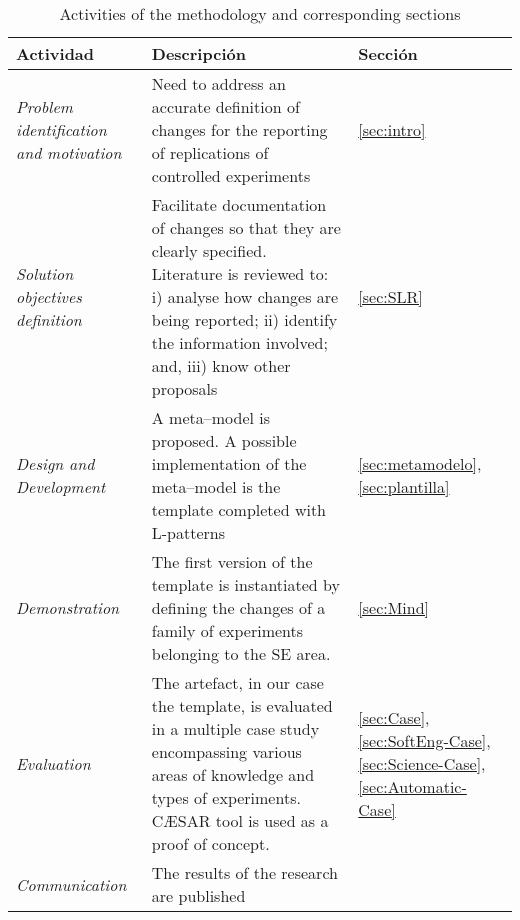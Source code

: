 \begin{table*}
  \caption{Activities of the \DSR methodology and corresponding sections}
  \label{tab:fases-DSR}
  \centering
  \scriptsize
  \begin{tabularx}{0.98\textwidth}{
    >{\hsize=0.4\hsize}X
    >{\hsize=0.9\hsize}X
    >{\hsize=0.23\hsize}X}
 
    \toprule
    Actividad  &
    Descripción   &
    Sección \\
    \midrule
    
    \emph{Problem identification and motivation}  &
    Need to address an accurate definition of changes for the reporting of replications of controlled experiments & 
    \ref{sec:intro}  \\ 
    
    \emph{Solution objectives definition}  & 
    Facilitate documentation of changes so that they are clearly specified. Literature is reviewed to: i) analyse how changes are being reported; ii) identify the information involved; and, iii) know other proposals &
    \ref{sec:SLR} \\
    
    \emph{Design and Development}  & 
    A meta--model is proposed. A possible implementation of the meta--model is the template completed with L-patterns & 
    \ref{sec:metamodelo}, \ref{sec:plantilla} \\
    
    \emph{Demonstration}  &
    The first version of the template is instantiated by defining the changes of a family of experiments belonging to the \gls{SE} area.  &
    \ref{sec:Mind} \\
    
    \emph{Evaluation}  &
    The artefact, in our case the template, is evaluated in a multiple case study encompassing various areas of knowledge and types of experiments. CÆSAR tool is used as a proof of concept. & 
    \ref{sec:Case},  \ref{sec:SoftEng-Case}, \ref{sec:Science-Case}, \ref{sec:Automatic-Case} \\
    
    \emph{Communication} & 
    The results of the research are published &  \\ 
    
    \bottomrule
  	\end{tabularx}   
\end{table*}